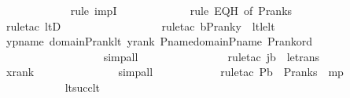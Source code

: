 \begin{isabellebody}
\ \ \ \ \ \ \ \ \ \ \ \isamarkupfalse%
\ {\isacharparenleft}{\kern0pt}rule\ impI{\isacharparenright}{\kern0pt}\ \isanewline
\ \ \ \ \ \ \ \ \ \ \isamarkupfalse%
\ {\isacharparenleft}{\kern0pt}rule\ EQH\ {\isacharbrackleft}{\kern0pt}of\ {\isachardoublequoteopen}P{\isacharunderscore}{\kern0pt}rank{\isacharparenleft}{\kern0pt}s{\isacharparenright}{\kern0pt}{\isachardoublequoteclose}{\isacharbrackright}{\kern0pt}{\isacharparenright}{\kern0pt}\ \isanewline
\ \ \ \ \ \ \ \ \ \ \ \ \ \ \ \ \isamarkupfalse%
\ {\isacharparenleft}{\kern0pt}rule{\isacharunderscore}{\kern0pt}tac\ ltD{\isacharparenright}{\kern0pt}\ \isanewline
\ \ \ \ \ \ \ \ \ \ \ \ \ \ \ \ \isamarkupfalse%
{\isacharparenleft}{\kern0pt}rule{\isacharunderscore}{\kern0pt}tac\ b{\isacharequal}{\kern0pt}{\isachardoublequoteopen}P{\isacharunderscore}{\kern0pt}rank{\isacharparenleft}{\kern0pt}y{\isacharparenright}{\kern0pt}{\isachardoublequoteclose}\ \ lt{\isacharunderscore}{\kern0pt}le{\isacharunderscore}{\kern0pt}lt{\isacharparenright}{\kern0pt}\ \isanewline
\ \ \ \ \ \ \ \ \ \ \isamarkupfalse%
\ ypname\ domain{\isacharunderscore}{\kern0pt}P{\isacharunderscore}{\kern0pt}rank{\isacharunderscore}{\kern0pt}lt\ yrank\ P{\isacharunderscore}{\kern0pt}name{\isacharunderscore}{\kern0pt}domain{\isacharunderscore}{\kern0pt}P{\isacharunderscore}{\kern0pt}name\ P{\isacharunderscore}{\kern0pt}rank{\isacharunderscore}{\kern0pt}ord\ \isanewline
\ \ \ \ \ \ \ \ \ \ \ \ \ \ \ \ \ \isamarkupfalse%
\ simp{\isacharunderscore}{\kern0pt}all\ \ \ \isanewline
\ \ \ \ \ \ \ \ \ \ \ \isamarkupfalse%
\ {\isacharparenleft}{\kern0pt}rule{\isacharunderscore}{\kern0pt}tac\ j{\isacharequal}{\kern0pt}b\ \ le{\isacharunderscore}{\kern0pt}trans{\isacharparenright}{\kern0pt}\ \isanewline
\ \ \ \ \ \ \ \ \ \ \isamarkupfalse%
\ xrank\ \isanewline
\ \ \ \ \ \ \ \ \ \ \ \ \isamarkupfalse%
\ simp{\isacharunderscore}{\kern0pt}all\ \isanewline
\ \ \ \ \ \ \ \ \ \ \isamarkupfalse%
{\isacharparenleft}{\kern0pt}rule{\isacharunderscore}{\kern0pt}tac\ P{\isacharequal}{\kern0pt}{\isachardoublequoteopen}b\ {\isacharless}{\kern0pt}\ P{\isacharunderscore}{\kern0pt}rank{\isacharparenleft}{\kern0pt}s{\isacharparenright}{\kern0pt}{\isachardoublequoteclose}\ \ mp{\isacharparenright}{\kern0pt}\ \isanewline
\ \ \ \ \ \ \ \ \ \ \isamarkupfalse%
\ lt{\isacharunderscore}{\kern0pt}succ{\isacharunderscore}{\kern0pt}lt\ \isanewline

\end{isabellebody}
